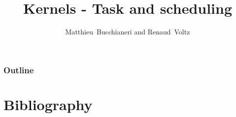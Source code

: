 %
%
%
%
%
%

%
%

\newcommand{\path}{../../..}

%
%



%
%

\title{Kernels - Task and scheduling}

%
%

\author
{
  Matthieu~Bucchianeri and Renaud~Voltz
}

%
%



%
%

\begin{frame}
  \titlepage

  \begin{center}
    \logos
  \end{center}
\end{frame}

%
%

\begin{frame}
  \frametitle{Outline}
  \tableofcontents
\end{frame}

%
%



%
%

\section{Bibliography}

\begin{thebibliography}{4}


\end{thebibliography}


